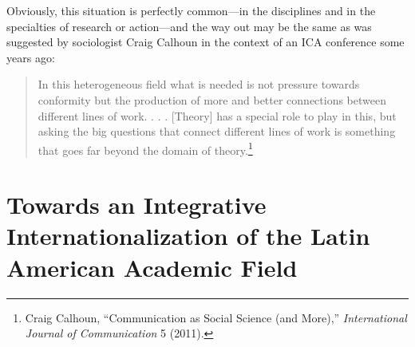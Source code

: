\documentclass{tufte-handout}
\begin{document}
Obviously, this situation is perfectly common---in the disciplines and
in the specialties of research or action---and the way out may be the
same as was suggested by sociologist Craig Calhoun in the context of an
ICA conference some years ago:

\begin{quote}
In this heterogeneous field what is needed is not pressure towards
conformity but the production of more and better connections between
different lines of work. . . . {[}Theory{]} has a special role to play
in this, but asking the big questions that connect different lines of
work is something that goes far beyond the domain of theory.\footnote{Craig
  Calhoun, ``Communication as Social Science (and More),''
  \emph{International Journal of Communication} 5 (2011).}
\end{quote}

\hypertarget{towards-an-integrative-internationalization-of-the-latin-american-academic-field}{%
\section{Towards an Integrative Internationalization of the Latin\\\noindent
American Academic
Field}\label{towards-an-integrative-internationalization-of-the-latin-american-academic-field}}
\end{document}
